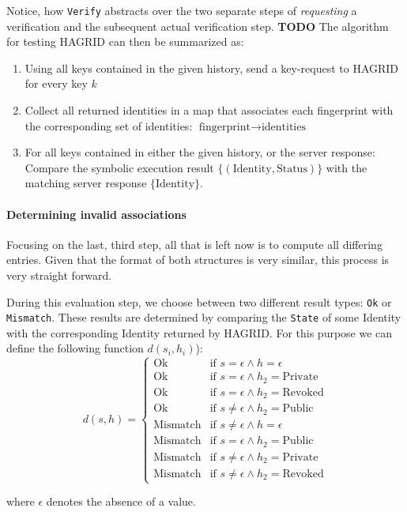 
Notice, how \texttt{Verify} abstracts over the two separate steps of \emph{requesting} a verification and the subsequent actual verification step.
\textbf{TODO}
The algorithm for testing HAGRID can then be summarized as: 
\begin{enumerate}
    \item Using all keys contained in the given history, send a key-request to HAGRID for every key $k$
    \item Collect all returned identities in a map that associates each fingerprint with the corresponding set of identities: $ \text{fingerprint} \rightarrow \text{identities}$
    \item\label{sec:comp_hagrid} For all keys contained in either the given history, or the server response: Compare the symbolic execution result $\{(\text{Identity},\text{Status})\}$ with the matching server response $\{\text{Identity}\}$.
\end{enumerate}

\paragraph{Determining invalid associations}
Focusing on the last, third step, all that is left now is to compute all differing entries. Given that the format of both structures is very similar, this process is very straight forward.

During this evaluation step, we choose between two different result types: \texttt{Ok} or \texttt{Mismatch}.
These results are determined by comparing the \texttt{State} of some Identity with the corresponding Identity returned by HAGRID. For this purpose we can define the following function \(d(s_i,h_i)\)): 
\[
    d(s,h) = \begin{cases}
        \text{Ok} & \text{if } s = \epsilon \wedge h = \epsilon \\
        \text{Ok} & \text{if } s = \epsilon \wedge h_2 = \text{Private} \\
        \text{Ok} & \text{if } s = \epsilon \wedge h_2 = \text{Revoked} \\
        \text{Ok} & \text{if } s \neq \epsilon \wedge h_2 = \text{Public} \\

        \text{Mismatch} & \text{if } s \neq \epsilon \wedge h = \epsilon \\
        \text{Mismatch} & \text{if } s = \epsilon \wedge h_2 = \text{Public} \\
        \text{Mismatch} & \text{if } s \neq \epsilon \wedge h_2 = \text{Private} \\
        \text{Mismatch} & \text{if } s \neq \epsilon \wedge h_2 = \text{Revoked} 
    \end{cases}    
\]

where \(\epsilon\) denotes the absence of a value.

